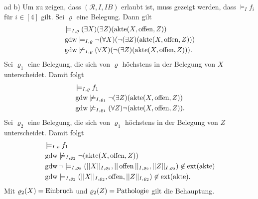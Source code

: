 \documentclass[12pt,a4paper]{amsart}
\begin{document}
ad b) Um zu zeigen, dass $(\mathcal{R},I,IB)$ erlaubt ist, muss gezeigt werden, dass $\models_If_i$ für $i\in[4]$ gilt. Sei $\varrho$ eine Belegung.
Dann gilt
\begin{align*}
&\models_{I,\varrho}    (\exists X)(\exists Z)(\operatorname{akte}(X,\operatorname{offen},Z))\\
&\operatorname{gdw} \models_{I,\varrho}    \lnot (\forall X) (\lnot (\exists Z)(\operatorname{akte}(X,\operatorname{offen},Z)))\\
&\operatorname{gdw} \not\models_{I,\varrho}(\forall X)(\lnot(\exists Z)(\operatorname{akte}(X,\operatorname{offen},Z))).
\end{align*}
Sei $\varrho_1$ eine Belegung, die sich von $\varrho$ höchstens in der Belegung von $X$ unterscheidet. Damit folgt
\begin{align*}
&\models_{I,\varrho} f_1\\
&\operatorname{gdw}\not\models_{I,\varrho_1} \lnot (\exists Z)(\operatorname{akte}(X,\operatorname{offen},Z))\\
&\operatorname{gdw}\not\models_{I,\varrho_1} (\forall Z)\lnot (\operatorname{akte}(X,\operatorname{offen},Z)).
\end{align*}
Sei $\varrho_2$ eine Belegung, die sich von $\varrho_1$ höchstens in der Belegung von $Z$ unterscheidet. Damit folgt
\begin{align*}
&\models_{I,\varrho} f_1\\
&\operatorname{gdw}\not\models_{I,\varrho_2} \lnot (\operatorname{akte}(X,\operatorname{offen},Z))\\
&\operatorname{gdw}\lnot\models_{I,\varrho_2} (||X||_{I,\varrho_2},||\operatorname{offen}||_{I,\varrho_2},||Z||_{I,\varrho_2})\not\in\operatorname{ext}(\operatorname{akte})\\
&\operatorname{gdw}\models_{I,\varrho_2}(||X||_{I,\varrho_2},\operatorname{offen},||Z||_{I,\varrho_2})\not\in\operatorname{ext}(\operatorname{akte}).
\end{align*}
Mit $\varrho_2(X)=\operatorname{Einbruch}$ und $\varrho_2(Z)=\operatorname{Pathologie}$ gilt die Behauptung.

\medskip
\end{document}
